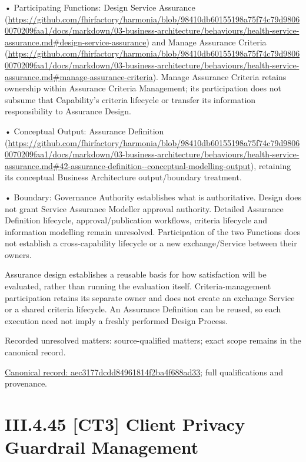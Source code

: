 •
Participating Functions: Design Service Assurance (\url{https://github.com/fhirfactory/harmonia/blob/98410db60155198a75f74c79d98060070209faa1/docs/markdown/03-business-architecture/behaviours/health-service-assurance.md#design-service-assurance}) and Manage Assurance Criteria (\url{https://github.com/fhirfactory/harmonia/blob/98410db60155198a75f74c79d98060070209faa1/docs/markdown/03-business-architecture/behaviours/health-service-assurance.md#manage-assurance-criteria}). Manage Assurance Criteria retains ownership within Assurance Criteria Management; its participation does not subsume that Capability's criteria lifecycle or transfer its information responsibility to Assurance Design.



•
Conceptual Output: Assurance Definition (\url{https://github.com/fhirfactory/harmonia/blob/98410db60155198a75f74c79d98060070209faa1/docs/markdown/03-business-architecture/behaviours/health-service-assurance.md#42-assurance-definition--conceptual-modelling-output}), retaining its conceptual Business Architecture output/boundary treatment.



•
Boundary: Governance Authority establishes what is authoritative. Design does not grant Service Assurance Modeller approval authority. Detailed Assurance Definition lifecycle, approval/publication workflows, criteria lifecycle and information modelling remain unresolved. Participation of the two Functions does not establish a cross-capability lifecycle or a new exchange/Service between their owners.



Assurance design establishes a reusable basis for how satisfaction will be evaluated, rather than running the evaluation itself. Criteria-management participation retains its separate owner and does not create an exchange Service or a shared criteria lifecycle. An Assurance Definition can be reused, so each execution need not imply a freshly performed Design Process.


{\small Recorded unresolved matters: source-qualified matters; exact scope remains in the canonical record.}\par
{\footnotesize \href{../../../../continuum/business/business-process/aec3177dcdd84961814f2ba4f688ad33.md}{Canonical record: aec3177dcdd84961814f2ba4f688ad33}; full qualifications and provenance.}\par
\section*{III.4.45 [CT3] Client Privacy Guardrail Management}
\label{navigation:III.4.45}

